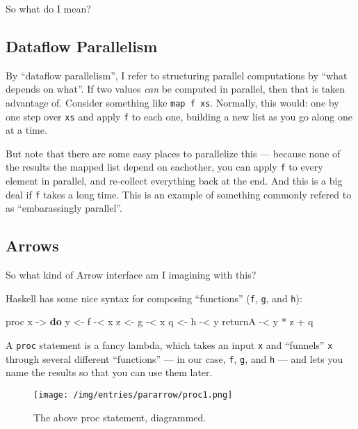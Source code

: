 \documentclass[]{article}
\newenvironment{Shaded}{}{}
\newcommand{\KeywordTok}[1]{\textcolor[rgb]{0.00,0.44,0.13}{\textbf{{#1}}}}
\newcommand{\OtherTok}[1]{\textcolor[rgb]{0.00,0.44,0.13}{{#1}}}
\newcommand{\FunctionTok}[1]{\textcolor[rgb]{0.02,0.16,0.49}{{#1}}}
\newcommand{\NormalTok}[1]{{#1}}
\begin{document}
So what do I mean?

\subsection{Dataflow Parallelism}\label{dataflow-parallelism}

By ``dataflow parallelism'', I refer to structuring parallel
computations by ``what depends on what''. If two values \emph{can} be
computed in parallel, then that is taken advantage of. Consider
something like \texttt{map\ f\ xs}. Normally, this would: one by one
step over \texttt{xs} and apply \texttt{f} to each one, building a new
list as you go along one at a time.

But note that there are some easy places to parallelize this --- because
none of the results the mapped list depend on eachother, you can apply
\texttt{f} to every element in parallel, and re-collect everything back
at the end. And this is a big deal if \texttt{f} takes a long time. This
is an example of something commonly refered to as ``embarassingly
parallel''.

\subsection{Arrows}\label{arrows}

So what kind of Arrow interface am I imagining with this?

Haskell has some nice syntax for composing ``functions'' (\texttt{f},
\texttt{g}, and \texttt{h}):

\begin{Shaded}
\begin{Highlighting}[]
\NormalTok{proc x }\OtherTok{->} \KeywordTok{do}
    \NormalTok{y }\OtherTok{<-} \NormalTok{f }\FunctionTok{-<} \NormalTok{x}
    \NormalTok{z }\OtherTok{<-} \NormalTok{g }\FunctionTok{-<} \NormalTok{x}
    \NormalTok{q }\OtherTok{<-} \NormalTok{h }\FunctionTok{-<} \NormalTok{y}
    \NormalTok{returnA }\FunctionTok{-<} \NormalTok{y }\FunctionTok{*} \NormalTok{z }\FunctionTok{+} \NormalTok{q}
\end{Highlighting}
\end{Shaded}

A \texttt{proc} statement is a fancy lambda, which takes an input
\texttt{x} and ``funnels'' \texttt{x} through several different
``functions'' --- in our case, \texttt{f}, \texttt{g}, and \texttt{h}
--- and lets you name the results so that you can use them later.

\begin{figure}[htbp]
\centering
\texttt{[image: /img/entries/pararrow/proc1.png]}
\caption{The above proc statement, diagrammed.}
\end{figure}
\end{document}
